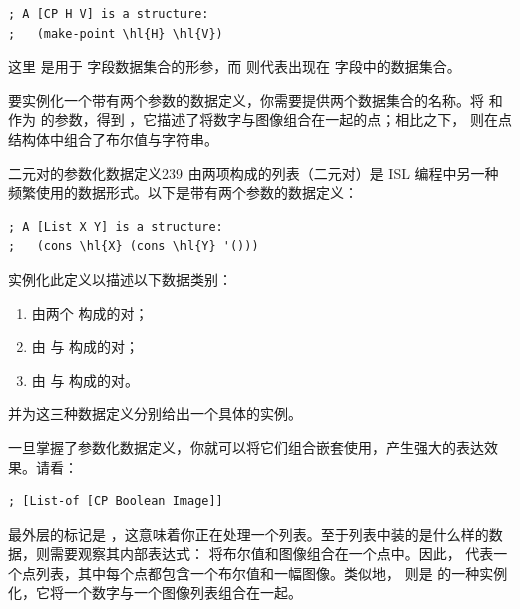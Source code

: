 \begin{stepperbox}
\begin{Verbatim}[commandchars=\\\{\}, fontsize=\footnotesize]
; A [CP H V] is a structure:
;   (make-point \hl{H} \hl{V})
\end{Verbatim}
\end{stepperbox}

这里  是用于  字段数据集合的形参，而  则代表出现在  字段中的数据集合。

要实例化一个带有两个参数的数据定义，你需要提供两个数据集合的名称。将  和  作为  的参数，得到 ，它描述了将数字与图像组合在一起的点；相比之下， 则在点结构体中组合了布尔值与字符串。

\begin{exercise}{二元对的参数化数据定义}{239}
由两项构成的列表（二元对）是 ISL 编程中另一种频繁使用的数据形式。以下是带有两个参数的数据定义：

\begin{stepperbox}
\begin{Verbatim}[commandchars=\\\{\}, fontsize=\scriptsize]
; A [List X Y] is a structure:
;   (cons \hl{X} (cons \hl{Y} '()))
\end{Verbatim}
\end{stepperbox}

实例化此定义以描述以下数据类别：
\begin{enumerate}
  \item 由两个  构成的对；
  \item 由  与  构成的对；
  \item 由  与  构成的对。
\end{enumerate}
并为这三种数据定义分别给出一个具体的实例。
\end{exercise}

一旦掌握了参数化数据定义，你就可以将它们组合嵌套使用，产生强大的表达效果。请看：

\begin{lstlisting}[language=BSL]
; [List-of [CP Boolean Image]]
\end{lstlisting}

最外层的标记是 \code{[List-of ...]}，这意味着你正在处理一个列表。至于列表中装的是什么样的数据，则需要观察其内部表达式： 将布尔值和图像组合在一个点中。因此， 代表一个点列表，其中每个点都包含一个布尔值和一幅图像。类似地， 则是  的一种实例化，它将一个数字与一个图像列表组合在一起。

